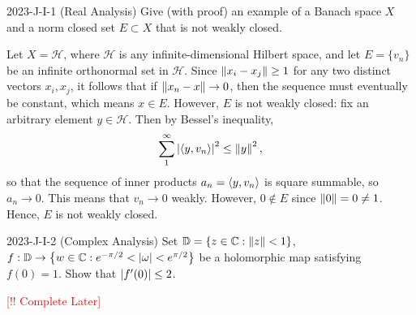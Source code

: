 \documentclass{article}
\begin{document}
\begin{prb}{2023-J-I-1 (Real Analysis)}
	Give (with proof) an example of a Banach space $X$ and a norm closed set $E \subset X$ that is not weakly closed. 
\end{prb}
\begin{solutions}
	Let $X = \mathscr{H}$, where $\mathscr{H}$ is any infinite-dimensional Hilbert space, and let $E = \{v_{n}\}$ be an infinite orthonormal set in $\mathscr{H}$. Since $\norm{x_{i} - x_{j}} \geq 1$ for any two distinct vectors $x_{i}, x_{j}$, it follows that if $\norm{x_{n} - x} \to 0$, then the sequence must eventually be constant, which means $x \in E$. However, $E$ is not weakly closed: fix an arbitrary element $y \in \mathscr{H}$. Then by Bessel's inequality, 
		\begin{equation}
			\sum_{1}^{\infty}\abs{\braket{y, v_{n}}}^{2} \leq \norm{y}^{2}, 
		\end{equation}
	so that the sequence of inner products $a_{n} = \braket{y, v_{n}}$ is square summable, so $a_{n} \to 0$. This means that $v_{n} \to 0$ weakly. However, $0 \notin E$ since $\norm{0} = 0\neq 1$. Hence, $E$ is not weakly closed. 
\end{solutions}
\begin{prb}{2023-J-I-2 (Complex Analysis)}
	Set $\mathbb{D} = \brac*{z \in \mathbb{C}: \norm{z} < 1}$, $f: \mathbb{D} \to \brac*{w \in \mathbb{C}: e^{-\pi/2} < \abs{\omega} < e^{\pi/2}}$ be a holomorphic map satisfying $f(0) = 1$. Show that $\abs{f'(0)} \leq 2$. 
\end{prb}
\begin{solutions}
	\textcolor{red}{[!! Complete Later]}
\end{solutions}
\end{document}
